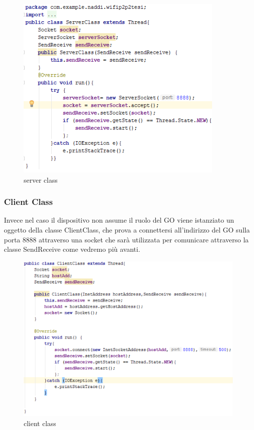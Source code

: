 \begin{figure}
   \caption{server class}
   \includegraphics[width=0.8\columnwidth]{imgs/serverClass.png}
   \centering
\end{figure}


\subsubsection{Client Class}
Invece nel caso il dispositivo non assume il ruolo del GO
viene istanziato un oggetto della classe ClientClass,
che prova a connettersi all'indirizzo del GO sulla porta 8888 attraverso
una socket che sarà utilizzata per comunicare
attraverso la classe SendReceive come vedremo più avanti.
  
\begin{figure}
   \caption{client class}
   \includegraphics[width=1\columnwidth]{imgs/clientClass.png}
   \centering
\end{figure}


